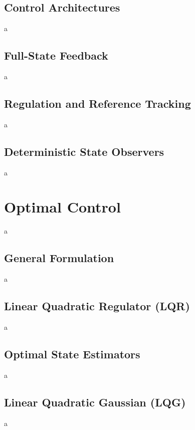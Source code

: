 \documentclass[a4paper,11pt]{book}
\numberwithin{figure}{chapter}
\numberwithin{equation}{chapter}
\numberwithin{table}{chapter}
\theoremstyle{definition}
\begin{document}
\section{Control Architectures}

a

\section{Full-State Feedback}

a

\section{Regulation and Reference Tracking}

a

\section{Deterministic State Observers}

a

\clearpage
\chapter{Optimal Control}

a

\section{General Formulation}

a

\section{Linear Quadratic Regulator (LQR)}

a

\section{Optimal State Estimators}

a

\section{Linear Quadratic Gaussian (LQG)}

a
\end{document}
